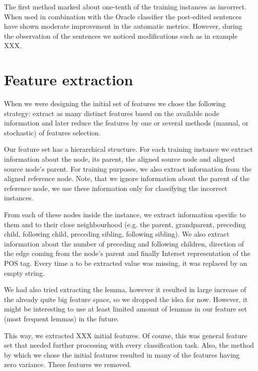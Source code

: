 The first method marked about one-tenth of the training instances as incorrect. When used in combination
with the Oracle classifier the post-edited sentences have shown moderate improvement in the automatic metrics.
However, during the observation of the sentences we noticed modifications such as in example XXX.




\section{Feature extraction}



When we were designing the initial set of features we chose the following
strategy: extract as many distinct features based on the available node information
and later reduce the features by one or several methods (manual, or stochastic)
of features selection.

Our feature set has a hierarchical structure. For each training instance we extract
information about the node, its parent, the aligned source node and aligned source node's
parent. For training purposes, we also extract information from the aligned reference
node. Note, that we ignore information about the parent of the reference node, we
use these information only for classifying the incorrect instances.

From each of these  nodes inside the instance, we extract information
specific to them and to their close neighbourhood (e.g. the parent, grandparent,
preceding child, following child, preceding sibling, following sibling). We
also extract information about the number of preceding and following children,
direction of the edge coming from the node's parent and finally Interset representation
of the POS tag. Every time a to be extracted value was missing, it was replaced by
an empty string.

We had also tried extracting the lemma, however it resulted in
large increase of the already quite big feature space, so we dropped the idea
for now. However, it might be interesting to use at least limited amount of lemmas in our
feature set (most frequent lemmas) in the future.

This way, we extracted XXX initial features. Of course, this was general feature
set that needed further processing with every classification task. Also, the method
by which we chose the initial features resulted in many of the features having zero
variance. These features we removed.


